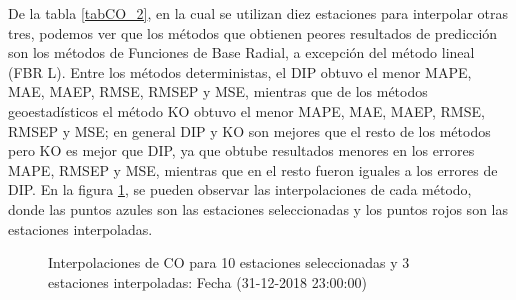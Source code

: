 De la tabla \ref{tabCO_2}, en la cual se utilizan diez estaciones para interpolar otras tres, podemos ver que los métodos que obtienen peores resultados de predicción son los métodos de Funciones de Base Radial, a excepción del método lineal (FBR L). Entre los métodos deterministas, el DIP obtuvo el menor MAPE, MAE, MAEP, RMSE, RMSEP y MSE, mientras que de los métodos geoestadísticos el método KO obtuvo el menor MAPE, MAE, MAEP, RMSE, RMSEP y MSE; en general DIP y KO son mejores que el resto de los métodos pero KO es mejor que DIP, ya que obtube resultados menores en los errores MAPE, RMSEP y MSE, mientras que en el resto fueron iguales a los errores de DIP. En la figura \ref{COfigure2}, se pueden observar las interpolaciones de cada método, donde las puntos azules son las estaciones seleccionadas y los puntos rojos son las estaciones interpoladas.

\begin{figure}[H]
\centering
{}
\subfigure[KO] {\texttt{[image: ./ok\_10\_0\_26302]}}
\subfigure[KU] {\texttt{[image: ./uk\_10\_0\_26302]}}
\caption{Interpolaciones de CO para 10 estaciones seleccionadas y 3 estaciones interpoladas: Fecha (31-12-2018 23:00:00)}
\label{COfigure2}
\end{figure}


